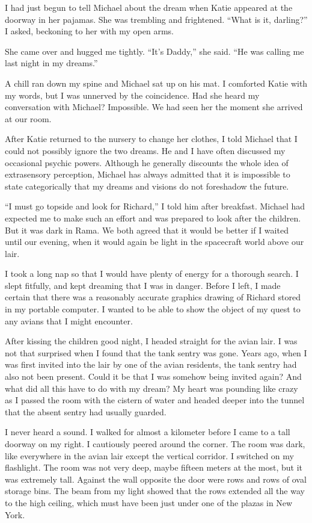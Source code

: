\documentclass[]{article}
\begin{document}
I had just begun to tell Michael about the dream when Katie appeared at the doorway in her pajamas. She was trembling and frightened. “What is it, darling?” I asked, beckoning to her with my open arms.

She came over and hugged me tightly. “It’s Daddy,” she said. “He was calling me last night in my dreams.”

A chill ran down my spine and Michael sat up on his mat. I comforted Katie with my words, but I was unnerved by the coincidence. Had she heard my conversation with Michael? Impossible. We had seen her the moment she arrived at our room.

After Katie returned to the nursery to change her clothes, I told Michael that I could not possibly ignore the two dreams. He and I have often discussed my occasional psychic powers. Although he generally discounts the whole idea of extrasensory perception, Michael has always admitted that it is impossible to state categorically that my dreams and visions do not foreshadow the future.

“I must go topside and look for Richard,” I told him after breakfast. Michael had expected me to make such an effort and was prepared to look after the children. But it was dark in Rama. We both agreed that it would be better if I waited until our evening, when it would again be light in the spacecraft world above our lair.

I took a long nap so that I would have plenty of energy for a thorough search. I slept fitfully, and kept dreaming that I was in danger. Before I left, I made certain that there was a reasonably accurate graphics drawing of Richard stored in my portable computer. I wanted to be able to show the object of my quest to any avians that I might encounter.

After kissing the children good night, I headed straight for the avian lair. I was not that surprised when I found that the tank sentry was gone. Years ago, when I was first invited into the lair by one of the avian residents, the tank sentry had also not been present. Could it be that I was somehow being invited again? And what did all this have to do with my dream? My heart was pounding like crazy as I passed the room with the cistern of water and headed deeper into the tunnel that the absent sentry had usually guarded.

I never heard a sound. I walked for almost a kilometer before I came to a tall doorway on my right. I cautiously peered around the corner. The room was dark, like everywhere in the avian lair except the vertical corridor. I switched on my flashlight. The room was not very deep, maybe fifteen meters at the most, but it was extremely tall. Against the wall opposite the door were rows and rows of oval storage bins. The beam from my light showed that the rows extended all the way to the high ceiling, which must have been just under one of the plazas in New York.
\end{document}
